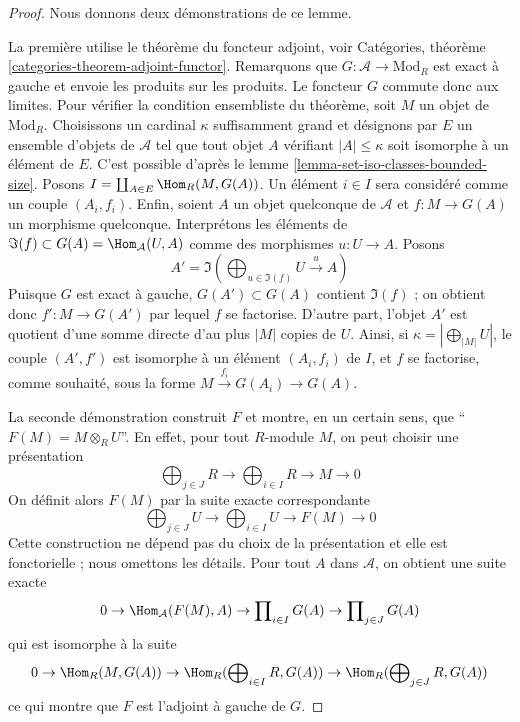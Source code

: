 \begin{proof}
Nous donnons deux démonstrations de ce lemme.

\medskip\noindent
La première utilise le théorème du foncteur adjoint, voir Catégories,
théorème \ref{categories-theorem-adjoint-functor}. Remarquons que
$G : \mathcal{A} \to \text{Mod}_R$ est exact à gauche et envoie les produits
sur les produits. Le foncteur $G$ commute donc aux limites. Pour vérifier la condition
ensembliste du théorème, soit $M$ un objet de $\text{Mod}_R$. Choisissons un
cardinal $\kappa$ suffisamment grand et désignons par $E$ un ensemble d'objets
de $\mathcal{A}$ tel que tout objet $A$ vérifiant $|A| \leq \kappa$ soit
isomorphe à un élément de $E$. C'est possible d'après le lemme
\ref{lemma-set-iso-classes-bounded-size}. Posons
$I = \coprod_{A \in E} \Hom_R(M, G(A))$. Un élément $i \in I$ sera considéré
comme un couple $(A_i, f_i)$. Enfin, soient $A$ un objet quelconque de
$\mathcal{A}$ et $f : M \to G(A)$ un morphisme quelconque. Interprétons les
éléments de $\Im(f) \subset G(A) = \Hom_\mathcal{A}(U, A)$ comme des
morphismes $u : U \to A$. Posons
$$
A' = \Im(\bigoplus\nolimits_{u \in \Im(f)} U \xrightarrow{u} A)
$$
Puisque $G$ est exact à gauche, $G(A') \subset G(A)$ contient $\Im(f)$ ; on
obtient donc $f' : M \to G(A')$ par lequel $f$ se factorise. D'autre part,
l'objet $A'$ est quotient d'une somme directe d'au plus $|M|$ copies de $U$.
Ainsi, si $\kappa = |\bigoplus_{|M|} U|$, le couple $(A', f')$ est isomorphe
à un élément $(A_i, f_i)$ de $I$, et $f$ se factorise, comme souhaité, sous
la forme $M \xrightarrow{f_i} G(A_i) \to G(A)$.

\medskip\noindent
La seconde démonstration construit $F$ et montre, en un certain sens, que
``$F(M) = M \otimes_R U$''. En effet, pour tout $R$-module $M$, on peut
choisir une présentation
$$
\bigoplus\nolimits_{j \in J} R \to
\bigoplus\nolimits_{i \in I} R \to
M \to 0
$$
On définit alors $F(M)$ par la suite exacte correspondante
$$
\bigoplus\nolimits_{j \in J} U \to
\bigoplus\nolimits_{i \in I} U \to
F(M) \to 0
$$
Cette construction ne dépend pas du choix de la présentation et elle est
fonctorielle ; nous omettons les détails. Pour tout $A$ dans $\mathcal{A}$,
on obtient une suite exacte
$$
0 \to \Hom_\mathcal{A}(F(M), A) \to
\prod\nolimits_{i \in I} G(A) \to
\prod\nolimits_{j \in J} G(A)
$$
qui est isomorphe à la suite
$$
0 \to \Hom_R(M, G(A)) \to
\Hom_R(\bigoplus\nolimits_{i \in I} R, G(A)) \to
\Hom_R(\bigoplus\nolimits_{j \in J} R, G(A))
$$
ce qui montre que $F$ est l'adjoint à gauche de $G$.
\end{proof}

